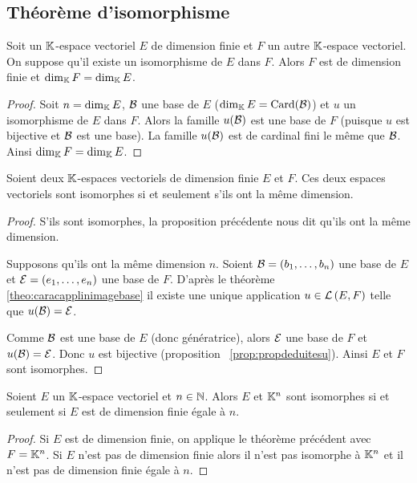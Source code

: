 \subsection{Théorème d'isomorphisme}

\begin{prop}
  Soit un \(\mathbb{K}\)-espace vectoriel \(E\) de dimension finie et \(F\) un autre \(\mathbb{K}\)-espace vectoriel. On suppose qu'il existe un isomorphisme de \(E\) dans \(F\). Alors \(F\) est de dimension finie et \(\operatorname{dim}_{\mathbb{K}} F = \operatorname{dim}_{\mathbb{K}} E\).
\end{prop}
\begin{proof}
  Soit \(n = \operatorname{dim}_{\mathbb{K}} E\), \(\mathcal{B}\) une base de \(E\) (\(\operatorname{dim}_{\mathbb{K}} E = \operatorname{Card}(\mathcal{B})\)) et \(u\) un isomorphisme de \(E\) dans \(F\). Alors la famille \(u(\mathcal{B})\) est une base de \(F\) (puisque \(u\) est bijective et \(\mathcal{B}\) est une base). La famille \(u(\mathcal{B})\) est de cardinal fini le même que \(\mathcal{B}\). Ainsi \(\operatorname{dim}_{\mathbb{K}} F = \operatorname{dim}_{\mathbb{K}} E\).
\end{proof}

\begin{theo}
  Soient deux \(\mathbb{K}\)-espaces vectoriels de dimension finie \(E\) et \(F\). Ces deux espaces vectoriels sont isomorphes si et seulement s'ils ont la même dimension.
\end{theo}
\begin{proof}
  S'ils sont isomorphes, la proposition précédente nous dit qu'ils ont la même dimension.

  Supposons qu'ils ont la même dimension \(n\). Soient \(\mathcal{B}=(b_1, \ldots, b_n)\) une base de \(E\) et \(\mathcal{E}=(e_1, \ldots, e_n)\) une base de \(F\). D'après le théorème~
\ref{theo:caracapplinimagebase} il existe une unique application \(u \in \mathcal{L}\left(E,F\right)\) telle que \(u(\mathcal{B})=\mathcal{E}\).

  Comme \(\mathcal{B}\) est une base de \(E\) (donc génératrice), alors \(\mathcal{E}\) une base de \(F\) et \(u(\mathcal{B})=\mathcal{E}\). Donc \(u\) est bijective (proposition~
\ref{prop:propdeduitesu}). Ainsi \(E\) et \(F\) sont isomorphes.
\end{proof}

\begin{corth}
  Soient \(E\) un \(\mathbb{K}\)-espace vectoriel et \(n \in \mathbb{N}\). Alors \(E\) et \(\mathbb{K}^n\) sont isomorphes si et seulement si \(E\) est de dimension finie égale à \(n\).
\end{corth}
\begin{proof}
  Si \(E\) est de dimension finie, on applique le théorème précédent avec \(F=\mathbb{K}^n\). Si \(E\) n'est pas de dimension finie alors il n'est pas isomorphe à \(\mathbb{K}^n\) et il n'est pas de dimension finie égale à \(n\).
\end{proof}


